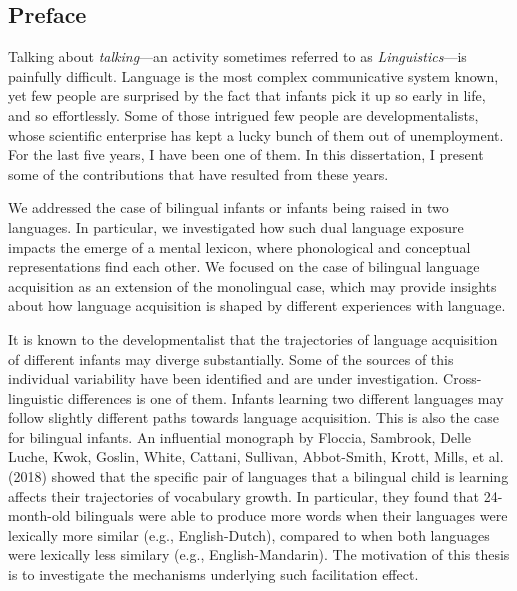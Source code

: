 \documentclass[
  12pt,
  b5paperpaper,
  twoside]{scrreprt}
\begin{document}
\begin{spacing}{1.5}

\clearpage
\chapter*{\sffamily Preface}
\vspace*{\baselineskip}
\normalsize{Talking about \emph{talking}---an activity sometimes
referred to as \emph{Linguistics}---is painfully difficult. Language is
the most complex communicative system known, yet few people are
surprised by the fact that infants pick it up so early in life, and so
effortlessly. Some of those intrigued few people are developmentalists,
whose scientific enterprise has kept a lucky bunch of them out of
unemployment. For the last five years, I have been one of them. In this
dissertation, I present some of the contributions that have resulted
from these years.

We addressed the case of bilingual infants or infants being raised in
two languages. In particular, we investigated how such dual language
exposure impacts the emerge of a mental lexicon, where phonological and
conceptual representations find each other. We focused on the case of
bilingual language acquisition as an extension of the monolingual case,
which may provide insights about how language acquisition is shaped by
different experiences with language.

It is known to the developmentalist that the trajectories of language
acquisition of different infants may diverge substantially. Some of the
sources of this individual variability have been identified and are
under investigation. Cross-linguistic differences is one of them.
Infants learning two different languages may follow slightly different
paths towards language acquisition. This is also the case for bilingual
infants. An influential monograph by Floccia, Sambrook, Delle Luche,
Kwok, Goslin, White, Cattani, Sullivan, Abbot-Smith, Krott, Mills, et
al. (2018) showed that the specific pair of languages that a bilingual
child is learning affects their trajectories of vocabulary growth. In
particular, they found that 24-month-old bilinguals were able to produce
more words when their languages were lexically more similar (e.g.,
English-Dutch), compared to when both languages were lexically less
similary (e.g., English-Mandarin). The motivation of this thesis is to
investigate the mechanisms underlying such facilitation effect.

}
\end{spacing}
\end{document}
